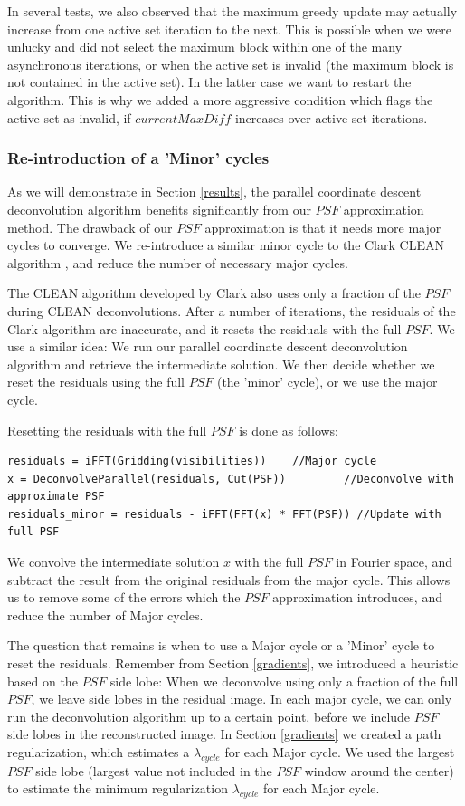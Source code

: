 In several tests, we also observed that the maximum greedy update may actually increase from one active set iteration to the next. This is possible when we were unlucky and did not select the maximum block within one of the many asynchronous iterations, or when the active set is invalid (the maximum block is not contained in the active set). In the latter case we want to restart the algorithm. This is why we added a more aggressive condition which flags the active set as invalid, if $currentMaxDiff$ increases over active set iterations.


\subsubsection*{Re-introduction of a 'Minor' cycles}
As we will demonstrate in Section \ref{results}, the parallel coordinate descent deconvolution algorithm benefits significantly from our $PSF$ approximation method. The drawback of our $PSF$ approximation is that it needs more major cycles to converge. We re-introduce a similar minor cycle to the Clark CLEAN algorithm \cite{clark1980efficient}, and reduce the number of necessary major cycles.

The CLEAN algorithm developed by Clark also uses only a fraction of the $PSF$ during CLEAN deconvolutions. After a number of iterations, the residuals of the Clark algorithm are inaccurate, and it resets the residuals with the full $PSF$. We use a similar idea: We run our parallel coordinate descent deconvolution algorithm and retrieve the intermediate solution. We then decide whether we reset the residuals using the full $PSF$ (the 'minor' cycle), or we use the major cycle.

Resetting the residuals with the full $PSF$ is done as follows:
\begin{lstlisting}
residuals = iFFT(Gridding(visibilities))  	//Major cycle
x = DeconvolveParallel(residuals, Cut(PSF)) 		//Deconvolve with approximate PSF
residuals_minor = residuals - iFFT(FFT(x) * FFT(PSF)) //Update with full PSF
\end{lstlisting}

We convolve the intermediate solution $x$ with the full $PSF$ in Fourier space, and subtract the result from the original residuals from the major cycle. This allows us to remove some of the errors which the $PSF$ approximation introduces, and reduce the number of Major cycles.

The question that remains is when to use a Major cycle or a 'Minor' cycle to reset the residuals. Remember from Section \ref{gradients}, we introduced a heuristic based on the $PSF$ side lobe: When we deconvolve using only a fraction of the full $PSF$, we leave side lobes in the residual image. In each major cycle, we can only run the deconvolution algorithm up to a certain point, before we include $PSF$ side lobes in the reconstructed image. In Section \ref{gradients} we created a path regularization, which estimates a $\lambda_{cycle}$ for each Major cycle. We used the largest $PSF$ side lobe (largest value not included in the $PSF$ window around the center) to estimate the minimum regularization $\lambda_{cycle}$ for each Major cycle.

